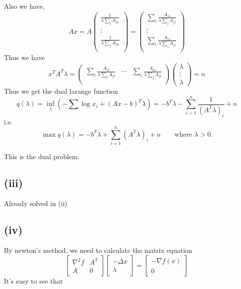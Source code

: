 \documentclass[11pt]{article}
\begin{document}
Also we have, \[Ax = 
A\left(\begin{array}{c}\frac{1}{\lambda \sum_j A_{j1}}\\
\vdots\\
\frac{1}{\lambda \sum_j A_{jn}}\\
\end{array}\right) = 
\left(
\begin{array}{c}\sum_i\frac{ A_{1i}}{\lambda \sum_j A_{ji}}\\
\vdots\\
\sum_i\frac{ A_{ni}}{\lambda \sum_j A_{ji}}\\
\end{array}\right)
\] Thus we have \[
x^TA^T \lambda = \left(
\begin{array}{c}\sum_i\frac{ A_{1i}}{\lambda \sum_j A_{ji}}&
\cdots&
\sum_i\frac{ A_{ni}}{\lambda \sum_j A_{ji}}\\
\end{array}\right)
\left(\begin{array}{cc}\lambda\\ 
\vdots\\
\lambda \end{array}\right) = n
\] Thus we get the dual larange function \[
q(\lambda) = \inf_{\lambda}( -\sum\log x_i + (Ax - b)^T\lambda) = -b^T\lambda - \sum_{i = 1}^{n} \frac{1}{(A^T\lambda)_i} + n
\] i.e. \[
\max q(\lambda) = -b^T\lambda +\sum_{i = 1}^{n} {(A^T\lambda)_i} + n\qquad \text{where } \lambda > 0.
\]

This is the dual problem.

    \subsection{(iii)}\label{iii}

Already solved in (ii)

    \subsection{(iv)}\label{iv}

By newton's method, we need to calculate the matrix equation \[
\begin{bmatrix}
\nabla^2 f &A^T\\
A& 0
\end{bmatrix}
\begin{bmatrix}
-\Delta x\\
\lambda
\end{bmatrix}
=
\begin{bmatrix}
-\nabla f(x)\\
0
\end{bmatrix}
\] It's easy to see that
\end{document}

